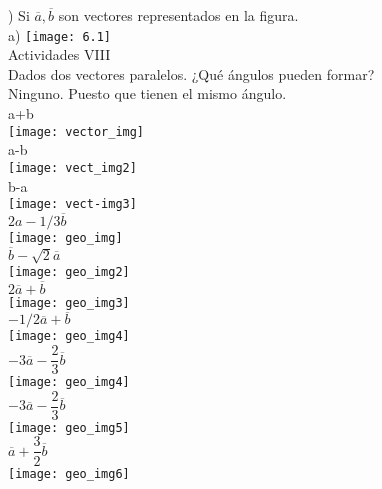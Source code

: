 \documentclass[11pt,a4paper]{article}
\begin{document}
\begin{justify}
) Si $\overline{a}, \overline{b}$ son vectores representados en la figura.\\


\noindent
a) \texttt{[image: 6.1]}\\  
 

\noindent
Actividades VIII\\

\noindent
Dados dos vectores paralelos. ¿Qué ángulos pueden formar?\\

\noindent
Ninguno. Puesto que tienen el mismo ángulo.\\

\noindent
a+b\\
\texttt{[image: vector\_img]}\\

\noindent
a-b\\
\texttt{[image: vect\_img2]}\\

\noindent
b-a\\
\texttt{[image: vect-img3]}\\

\noindent
$2a-1/3 \overline{b}$\\
\texttt{[image: geo\_img]}\\

\noindent
$\overline{b}-\sqrt{2}\overline{a}$\\
\texttt{[image: geo\_img2]}\\

\noindent
$2\overline{a}+\overline{b}$\\
\texttt{[image: geo\_img3]}\\

\noindent
$-1/2 \overline{a}+\overline{b}$\\
\texttt{[image: geo\_img4]}\\

\noindent
$-3\overline{a}-\dfrac{2}{3}\overline{b}$\\
\texttt{[image: geo\_img4]}\\

\noindent
$-3\overline{a}-\dfrac{2}{3}\overline{b}$\\
\texttt{[image: geo\_img5]}\\

\noindent
$\overline{a}+\dfrac{3}{2}\overline{b}$\\
\texttt{[image: geo\_img6]}\\


\end{justify}
\end{document}
